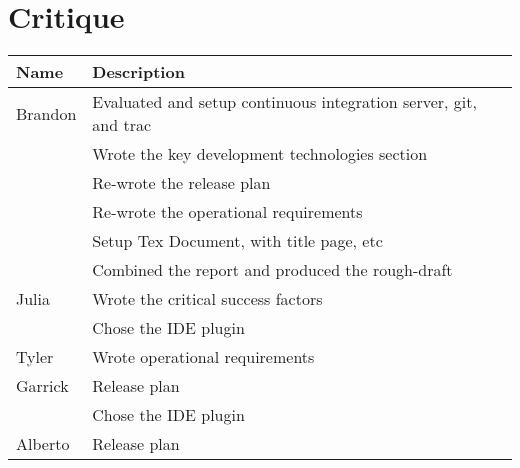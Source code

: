 \section{Critique}
\begin{tabular}{| l | l |}
\hline
Name & Description \\
\hline
Brandon & Evaluated and setup continuous integration server, git, and trac\\
 & Wrote the key development technologies section \\
 & Re-wrote the release plan \\
 & Re-wrote the operational requirements \\
 & Setup Tex Document, with title page, etc \\
 & Combined the report and produced the rough-draft \\
\hline
Julia & Wrote the critical success factors \\
 & Chose the IDE plugin \\
\hline
Tyler & Wrote operational requirements \\
\hline
Garrick & Release plan \\
 & Chose the IDE plugin \\
\hline
Alberto & Release plan \\
\hline
\end{tabular}
